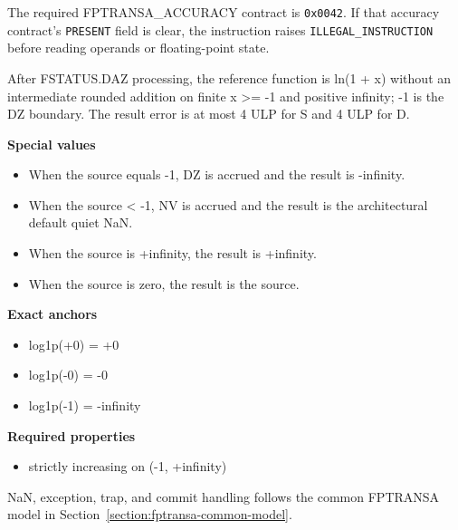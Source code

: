 The required FPTRANSA\_ACCURACY contract is \texttt{0x0042}. If that accuracy contract's \texttt{PRESENT} field is clear, the instruction raises \texttt{ILLEGAL\_INSTRUCTION} before reading operands or floating-point state.

After FSTATUS.DAZ processing, the reference function is ln(1 + x) without an intermediate rounded addition on finite x \textgreater{}= -1 and positive infinity; -1 is the DZ boundary. The result error is at most 4 ULP for S and 4 ULP for D.

\textbf{Special values}\par
\begin{itemize}
\item When the source equals -1, DZ is accrued and the result is -infinity.
\item When the source \textless{} -1, NV is accrued and the result is the architectural default quiet NaN.
\item When the source is +infinity, the result is +infinity.
\item When the source is zero, the result is the source.
\end{itemize}

\textbf{Exact anchors}\par
\begin{itemize}
\item log1p(+0) = +0
\item log1p(-0) = -0
\item log1p(-1) = -infinity
\end{itemize}

\textbf{Required properties}\par
\begin{itemize}
\item strictly increasing on (-1, +infinity)
\end{itemize}

NaN, exception, trap, and commit handling follows the common FPTRANSA model in Section~\ref{section:fptransa-common-model}.

